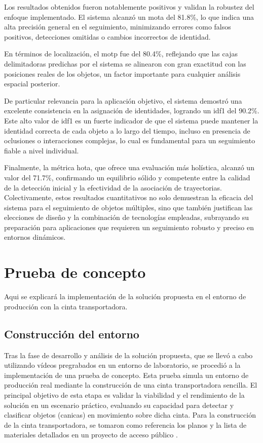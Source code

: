 \documentclass[11pt,spanish,listoffigures,listoftables]{tfgetsinf}
\begin{document}
Los resultados obtenidos fueron notablemente positivos y validan la robustez del enfoque implementado. El sistema alcanzó un \gls{mota} del 81.8\%, lo que indica una alta precisión general en el seguimiento, minimizando errores como falsos positivos, detecciones omitidas o cambios incorrectos de identidad.

En términos de localización, el \gls{motp} fue del 80.4\%, reflejando que las cajas delimitadoras predichas por el sistema se alinearon con gran exactitud con las posiciones reales de los objetos, un factor importante para cualquier análisis espacial posterior.

De particular relevancia para la aplicación objetivo, el sistema demostró una excelente consistencia en la asignación de identidades, logrando un \gls{idf1} del 90.2\%. Este alto valor de \gls{idf1} es un fuerte indicador de que el sistema puede mantener la identidad correcta de cada objeto a lo largo del tiempo, incluso en presencia de oclusiones o interacciones complejas, lo cual es fundamental para un seguimiento fiable a nivel individual.

Finalmente, la métrica \gls{hota}, que ofrece una evaluación más holística, alcanzó un valor del 71.7\%, confirmando un equilibrio sólido y competente entre la calidad de la detección inicial y la efectividad de la asociación de trayectorias.
Colectivamente, estos resultados cuantitativos no solo demuestran la eficacia del sistema para el seguimiento de objetos múltiples, sino que también justifican las elecciones de diseño y la combinación de tecnologías empleadas, subrayando su preparación para aplicaciones que requieren un seguimiento robusto y preciso en entornos dinámicos.

\chapter{Prueba de concepto} \label{chap:prueba_concepto}
Aqui se explicará la implementación de la solución propuesta en el entorno de producción con la cinta transportadora.

\section{Construcción del entorno} \label{sub:construccion_entorno}
Tras la fase de desarrollo y análisis de la solución propuesta, que se llevó a cabo utilizando vídeos pregrabados en un entorno de laboratorio, se procedió a la implementación de una prueba de concepto. Esta prueba simula un entorno de producción real mediante la construcción de una cinta transportadora sencilla. El principal objetivo de esta etapa es validar la viabilidad y el rendimiento de la solución en un escenario práctico, evaluando su capacidad para detectar y clasificar objetos (canicas) en movimiento sobre dicha cinta. Para la construcción de la cinta transportadora, se tomaron como referencia los planos y la lista de materiales detallados en un proyecto de acceso público \cite{hackster_counting_inspection}.
\end{document}

